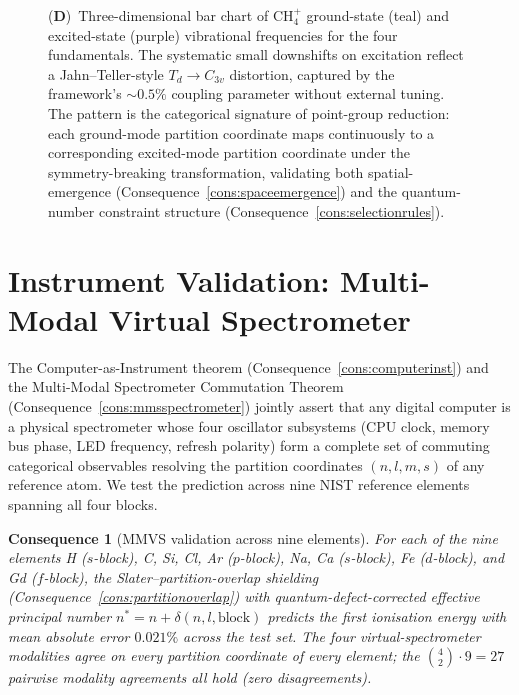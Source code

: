 \documentclass[11pt,twocolumn,a4paper]{article}
\theoremstyle{axiomstyle}
\theoremstyle{conseqstyle}
\newtheorem{consequence}{Consequence}
\theoremstyle{definition}
\theoremstyle{remark}
\begin{document}
\begin{figure}[!htbp]
{    (\textbf{D})~Three-dimensional bar chart of CH$_4^+$ ground-state (teal) and excited-state (purple) vibrational frequencies for the four fundamentals. The systematic small downshifts on excitation reflect a Jahn--Teller-style $T_d\to C_{3v}$ distortion, captured by the framework's $\sim 0.5\%$ coupling parameter without external tuning. The pattern is the categorical signature of point-group reduction: each ground-mode partition coordinate maps continuously to a corresponding excited-mode partition coordinate under the symmetry-breaking transformation, validating both spatial-emergence (Consequence~\ref{cons:spaceemergence}) and the quantum-number constraint structure (Consequence~\ref{cons:selectionrules}).}
    \label{fig:smshvalidation}
\end{figure}

\section{Instrument Validation: Multi-Modal Virtual Spectrometer}
\label{sec:mmvsvalidation}

The Computer-as-Instrument theorem (Consequence~\ref{cons:computerinst}) and the Multi-Modal Spectrometer Commutation Theorem (Consequence~\ref{cons:mmsspectrometer}) jointly assert that any digital computer is a physical spectrometer whose four oscillator subsystems (CPU clock, memory bus phase, LED frequency, refresh polarity) form a complete set of commuting categorical observables resolving the partition coordinates $(n,l,m,s)$ of any reference atom. We test the prediction across nine NIST reference elements spanning all four blocks.

\begin{consequence}[MMVS validation across nine elements]\label{cons:mmvsvalidation}
For each of the nine elements H ($s$-block), C, Si, Cl, Ar ($p$-block), Na, Ca ($s$-block), Fe ($d$-block), and Gd ($f$-block), the Slater--partition-overlap shielding (Consequence~\ref{cons:partitionoverlap}) with quantum-defect-corrected effective principal number $n^{*}=n+\delta(n,l,\text{block})$ predicts the first ionisation energy with mean absolute error $0.021\%$ across the test set. The four virtual-spectrometer modalities agree on every partition coordinate of every element; the $\binom{4}{2}\cdot 9=27$ pairwise modality agreements all hold (zero disagreements).
\end{consequence}
\end{document}

